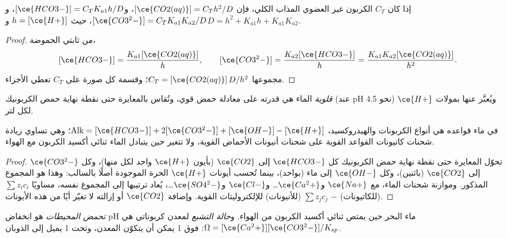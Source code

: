 \begin{proposition}\label{prop:b3:environmental-toxicology:carbonate-fractions}
إذا كان $C_T$ الكربون غير العضوي المذاب الكلي، فإن
$[\ce{CO2(aq)}] = C_Th^2/D$، و$[\ce{HCO3-}] = C_TK_{a1}h/D$، و$[\ce{CO3^2-}] = C_TK_{a1}K_{a2}/D$، حيث $h = [\ce{H+}]$ و$D = h^2 + K_{a1}h + K_{a1}K_{a2}$.
\end{proposition}

\begin{proof}
من ثابتي الحموضة،
\[
  [\ce{HCO3-}] = \frac{K_{a1}[\ce{CO2(aq)}]}{h}, \qquad [\ce{CO3^2-}] = \frac{K_{a2}[\ce{HCO3-}]}{h} = \frac{K_{a1}K_{a2}[\ce{CO2(aq)}]}{h^2}.
\]
مجموعها $C_T = [\ce{CO2(aq)}]\,D/h^2$؛ وقسمة كل صورة على $C_T$ تعطي الأجزاء.
\end{proof}

\begin{definition}[القلوية]\label{def:b3:environmental-toxicology:alkalinity}
\emph{قلوية} الماء هي قدرته على معادلة
حمض قوي، وتُقاس بالمعايرة حتى نقطة نهاية حمض الكربونيك (عند pH نحو
4.5) ويُعبَّر عنها بمولات $\ce{H+}$ لكل لتر.
\end{definition}

\begin{proposition}\label{prop:b3:environmental-toxicology:alkalinity}
في ماء قواعده هي أنواع الكربونات والهيدروكسيد،
$\mathrm{Alk} = [\ce{HCO3-}] + 2[\ce{CO3^2-}] + [\ce{OH-}] - [\ce{H+}]$؛ وهي تساوي زيادة شحنات كاتيونات القواعد القوية
على شحنات أنيونات الأحماض القوية، ولا تتغير حين يتبادل الماء
ثنائي أكسيد الكربون مع الهواء.
\end{proposition}

\begin{proof}
تحوّل المعايرة حتى نقطة نهاية حمض الكربونيك كل $\ce{HCO3-}$ إلى $\ce{CO2}$ (بأيون $\ce{H+}$ واحد لكل منها)،
وكل $\ce{CO3^2-}$ إلى $\ce{CO2}$ (باثنين)، وكل $\ce{OH-}$ إلى ماء (بواحد)، بينما تُحسب أيونات $\ce{H+}$ الحرة الموجودة أصلًا
بالسالب: وهذا هو المجموع المذكور. وموازنة شحنات الماء، مع
$\ce{Na+}$ و$\ce{Ca^2+}$\dots{} و$\ce{Cl-}$ و$\ce{SO4^2-}$\dots، يُعاد ترتيبها إلى المجموع نفسه، مساويًا $\sum z_i c_i$ (للكاتيونات) $-$ $\sum z_jc_j$ (للأنيونات)
للإلكتروليتات القوية. وإضافة $\ce{CO2}$ أو إزالته لا تغيّر أيًا من هذه الأيونات.
\end{proof}

\begin{definition}\label{def:b3:environmental-toxicology:acidification}
\emph{تحمض المحيطات} هو انخفاض
pH ماء البحر حين يمتص ثنائي أكسيد الكربون من الهواء. و\emph{حالة
التشبع} لمعدن كربوناتي هي
$\Omega = [\ce{Ca^2+}][\ce{CO3^2-}]/K_{sp}$: فوق 1 يمكن أن يتكوّن المعدن، وتحت 1 يميل إلى الذوبان.
\end{definition}

